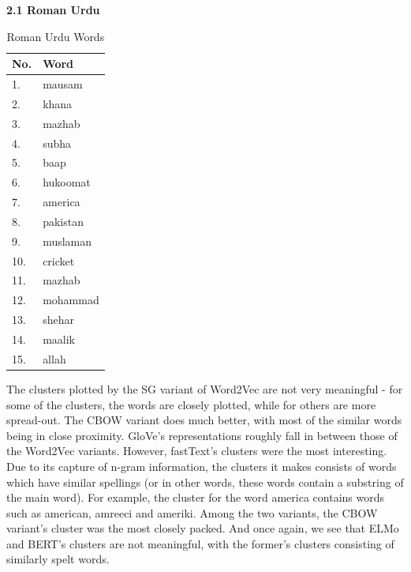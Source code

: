 \documentclass[format=acmsmall,review=true,screen=true]{acmart}
\begin{document}
\textbf{2.1 Roman Urdu}\\

        \begin{table}[]
    \begin{tabular}{|l|l|}
        \hline
                            \textbf{No.} & \textbf{Word}    \\
    \hline
    1.            &      mausam\\
       \hline
    \hline
    2.           &      khana\\
       \hline
    \hline
    3.             &      mazhab\\
       \hline
    \hline
    4.             &      subha\\
       \hline
        \hline
    5.             &      baap\\
       \hline
    \hline
    6.             &      hukoomat\\
       \hline
    \hline
    7.             &      america\\
       \hline
    \hline
    8.             &      pakistan\\
       \hline
    \hline
    9.             &      muslaman\\
       \hline
    \hline
    10.             &      cricket\\
       \hline
    \hline
    11.             &     mazhab\\
       \hline
    \hline
    12.             &      mohammad\\
       \hline      
    \hline
    13.             &      shehar\\
       \hline     
    \hline
    14.             &     maalik\\
       \hline     
    \hline
    15.             &      allah\\
       \hline           
       
    \end{tabular}
    \caption{\label{tab:table-name}Roman Urdu Words}
    \end{table}

The clusters plotted by the SG variant of Word2Vec are not very meaningful - for some of the clusters, the words are closely plotted, while for others are more spread-out. The CBOW variant does much better, with most of the similar words being in close proximity. GloVe’s representations roughly fall in between those of the Word2Vec variants. However, fastText’s clusters were the most interesting. Due to its capture of n-gram information, the clusters it makes consists of words which have similar spellings (or in other words, these words contain a substring of the main word). For example, the cluster for the word america contains words such as american, amreeci and ameriki. Among the two variants, the CBOW variant’s cluster was the most closely packed. And once again, we see that ELMo and BERT’s clusters are not meaningful, with the former’s clusters consisting of similarly spelt words.\\
\end{document}
